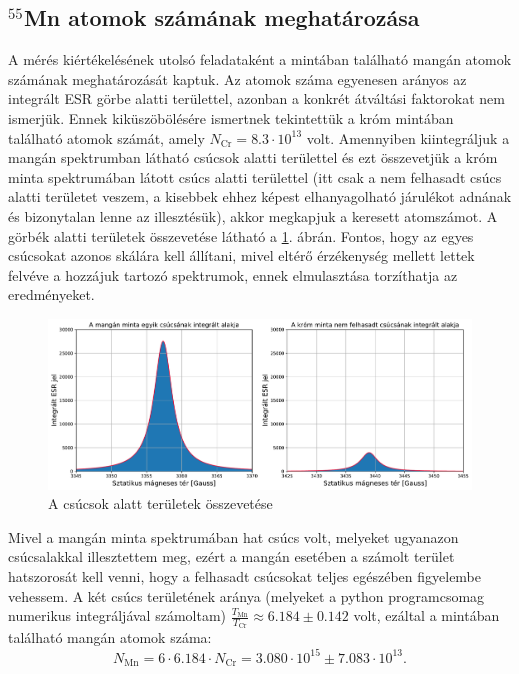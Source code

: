 \documentclass[12pt,a4paper]{article}
\begin{document}
\subsection{$^{55}$Mn atomok számának meghatározása}
\hspace*{10pt} A mérés kiértékelésének utolsó feladataként a mintában található mangán atomok számának meghatározását kaptuk. Az atomok száma egyenesen arányos az integrált ESR görbe alatti területtel, azonban a konkrét átváltási faktorokat nem ismerjük. Ennek kiküszöbölésére ismertnek tekintettük a króm mintában található atomok számát, amely $N_{\textrm{Cr}}= 8.3 \cdot 10^{13} $ volt. Amennyiben kiintegráljuk a mangán spektrumban látható csúcsok alatti területtel és ezt összevetjük a króm minta spektrumában látott csúcs alatti területtel (itt csak a nem felhasadt csúcs alatti területet veszem, a kisebbek ehhez képest elhanyagolható járulékot adnának és bizonytalan lenne az illesztésük), akkor megkapjuk a keresett atomszámot. A görbék alatti területek összevetése látható a \ref{fig:terület}. ábrán. Fontos, hogy az egyes csúcsokat azonos skálára kell állítani, mivel eltérő érzékenység mellett lettek felvéve a hozzájuk tartozó spektrumok, ennek elmulasztása torzíthatja az eredményeket.\\
\begin{figure}[!h]
\centering
\includegraphics[scale=0.4]{int_alakok}
\caption{A csúcsok alatt területek összevetése}
\label{fig:terület}
\end{figure}
\newline
Mivel a mangán minta spektrumában hat csúcs volt, melyeket ugyanazon csúcsalakkal illesztettem meg, ezért a mangán esetében a számolt terület hatszorosát kell venni, hogy a felhasadt csúcsokat teljes egészében figyelembe vehessem. A két csúcs területének aránya (melyeket a python programcsomag numerikus integráljával számoltam) $\frac{T_{\textrm{Mn}}}{T_{\textrm{Cr}}}\approx 6.184\pm 0.142$ volt, ezáltal a mintában található mangán atomok száma:
$$N_{\textrm{Mn}}=6\cdot 6.184 \cdot N_{\textrm{Cr}} = 3.080 \cdot 10^{15} \pm 7.083 \cdot 10^{13}.$$
\end{document}
